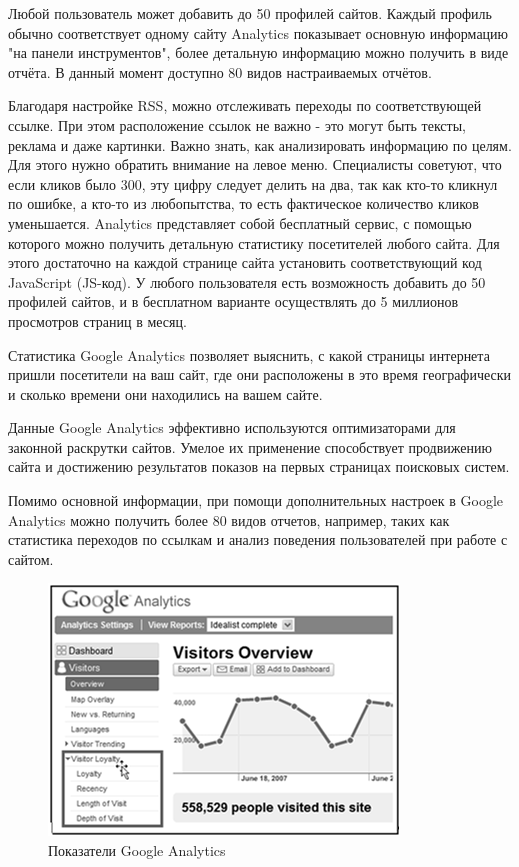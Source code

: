 \documentclass[a4paper,english,russian]{G2-105}
\begin{document}
\par Любой пользователь может добавить до 50 профилей сайтов. Каждый профиль обычно соответствует одному сайту Analytics показывает основную информацию "на панели инструментов", более детальную информацию можно получить в виде отчёта. В данный момент доступно 80 видов настраиваемых отчётов.
\par Благодаря настройке RSS, можно отслеживать переходы по соответствующей ссылке. При этом расположение ссылок не важно - это могут быть тексты, реклама и даже картинки. Важно знать, как анализировать информацию по целям. Для этого нужно обратить внимание на левое меню. Специалисты советуют, что если кликов было 300, эту цифру следует делить на два, так как кто-то кликнул по ошибке, а кто-то из любопытства, то есть фактическое количество кликов уменьшается. Analytics представляет собой бесплатный сервис, с помощью которого можно получить детальную статистику посетителей любого сайта. Для этого достаточно на каждой странице сайта установить соответствующий код JavaScript (JS-код). У любого пользователя есть возможность добавить до 50 профилей сайтов, и в бесплатном варианте осуществлять до 5 миллионов просмотров страниц в месяц.
\par Статистика Google Analytics позволяет выяснить, с какой страницы интернета пришли посетители на ваш сайт, где они расположены в это время географически и сколько времени они находились на вашем сайте.
\par Данные Google Analytics эффективно используются оптимизаторами для законной раскрутки сайтов. Умелое их применение способствует продвижению сайта и достижению результатов показов на первых страницах поисковых систем.
\par Помимо основной информации, при помощи дополнительных настроек в Google Analytics можно получить более 80 видов отчетов, например, таких как статистика переходов по ссылкам и анализ поведения пользователей при работе с сайтом.
\begin{figure}
    \includegraphics[width=\linewidth]{ris1.png}
    \caption{Показатели Google Analytics}
	\label{ris1}
\end{figure}
\end{document}
